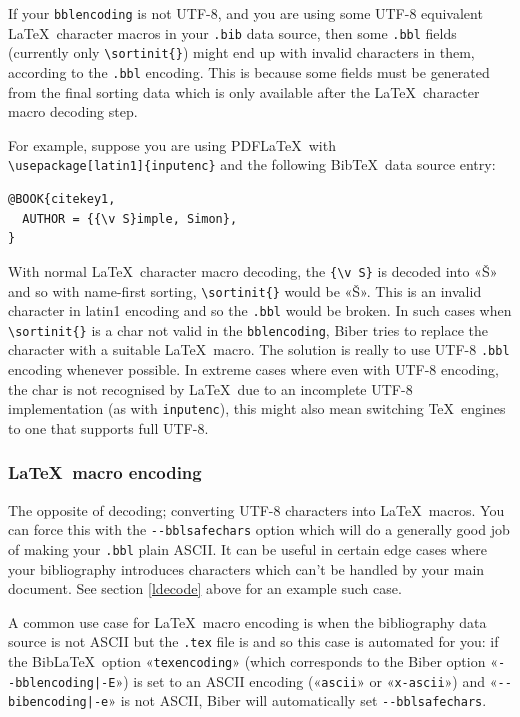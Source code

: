 \documentclass{ltxdockit}
\begin{document}
If your \verb+bblencoding+ is not UTF-8, and you are using some UTF-8
equivalent \LaTeX\ character macros in your \verb+.bib+ data source, then some
\verb+.bbl+ fields (currently only \verb+\sortinit{}+) might end up
with invalid characters in them, according to the \verb+.bbl+
encoding. This is because some fields must be generated from the final
sorting data which is only available after the \LaTeX\ character macro
decoding step.

For example, suppose you are using PDF\LaTeX\ with\\
\verb+\usepackage[latin1]{inputenc}+ and the following Bib\TeX\
data source entry:

\begin{verbatim}
@BOOK{citekey1,
  AUTHOR = {{\v S}imple, Simon},
}
\end{verbatim}

\noindent With normal \LaTeX\ character macro decoding, the
\verb+{\v S}+ is decoded into «Š» and so with name-first sorting,
\verb+\sortinit{}+ would be «Š». This is an invalid character in
latin1 encoding and so the \verb+.bbl+ would be broken. In such cases
when \verb+\sortinit{}+ is a char not valid in the \verb+bblencoding+,
Biber tries to replace the character with a suitable \LaTeX\
macro. The solution is really to use UTF-8 \verb+.bbl+ encoding whenever
possible. In extreme cases where even with UTF-8 encoding,
the char is not recognised by \LaTeX\ due to an incomplete UTF-8
implementation (as with \verb+inputenc+), this might also mean
switching \TeX\ engines to one that supports full UTF-8.

\subsubsection{\LaTeX\ macro encoding}\label{lencode}

The opposite of decoding; converting UTF-8 characters into \LaTeX\ macros.
You can force this with the \verb+--bblsafechars+ option which will do a
generally good job of making your \verb+.bbl+ plain ASCII. It can be useful
in certain edge cases where your bibliography introduces characters which
can't be handled by your main document. See section \ref{ldecode} above for
an example such case.

A common use case for \LaTeX\ macro encoding is when the bibliography
data source is not ASCII but the \verb+.tex+ file is and so this case
is automated for you: if the Bib\LaTeX\ option «\verb+texencoding+»
(which corresponds to the Biber option «\verb+--bblencoding|-E+») is
set to an ASCII encoding («\verb+ascii+» or «\verb+x-ascii+») and
«\verb+--bibencoding|-e+» is not ASCII, Biber will automatically set
\verb+--bblsafechars+.
\end{document}
